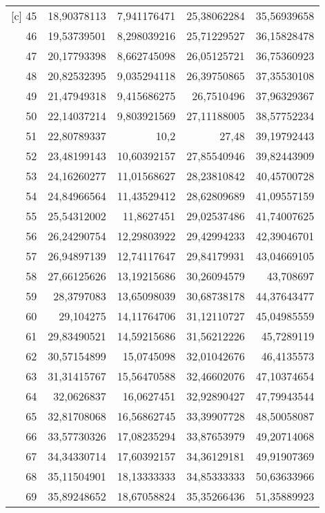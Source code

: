 \begin{longtable}{r|rrrr}[c]
    45    & 18,90378113 & 7,941176471 & 25,38062284 & 35,56939658 \\
    46    & 19,53739501 & 8,298039216 & 25,71229527 & 36,15828478 \\
    47    & 20,17793398 & 8,662745098 & 26,05125721 & 36,75360923 \\
    48    & 20,82532395 & 9,035294118 & 26,39750865 & 37,35530108 \\
    49    & 21,47949318 & 9,415686275 & 26,7510496 & 37,96329367 \\
    50    & 22,14037214 & 9,803921569 & 27,11188005 & 38,57752234 \\
    51    & 22,80789337 & 10,2  & 27,48 & 39,19792443 \\
    52    & 23,48199143 & 10,60392157 & 27,85540946 & 39,82443909 \\
    53    & 24,16260277 & 11,01568627 & 28,23810842 & 40,45700728 \\
    54    & 24,84966564 & 11,43529412 & 28,62809689 & 41,09557159 \\
    55    & 25,54312002 & 11,8627451 & 29,02537486 & 41,74007625 \\
    56    & 26,24290754 & 12,29803922 & 29,42994233 & 42,39046701 \\
    57    & 26,94897139 & 12,74117647 & 29,84179931 & 43,04669105 \\
    58    & 27,66125626 & 13,19215686 & 30,26094579 & 43,708697 \\
    59    & 28,3797083 & 13,65098039 & 30,68738178 & 44,37643477 \\
    60    & 29,104275 & 14,11764706 & 31,12110727 & 45,04985559 \\
    61    & 29,83490521 & 14,59215686 & 31,56212226 & 45,7289119 \\
    62    & 30,57154899 & 15,0745098 & 32,01042676 & 46,4135573 \\
    63    & 31,31415767 & 15,56470588 & 32,46602076 & 47,10374654 \\
    64    & 32,0626837 & 16,0627451 & 32,92890427 & 47,79943544 \\
    65    & 32,81708068 & 16,56862745 & 33,39907728 & 48,50058087 \\
    66    & 33,57730326 & 17,08235294 & 33,87653979 & 49,20714068 \\
    67    & 34,34330714 & 17,60392157 & 34,36129181 & 49,91907369 \\
    68    & 35,11504901 & 18,13333333 & 34,85333333 & 50,63633966 \\
    69    & 35,89248652 & 18,67058824 & 35,35266436 & 51,35889923 \\

\end{longtable}
